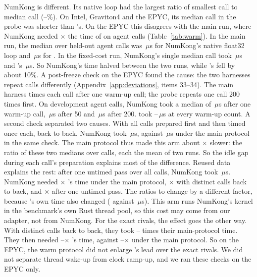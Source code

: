 NumKong is different.
Its native loop had the largest ratio of smallest call to median call (--\%).
On Intel, Graviton4 and the EPYC, its median call in the probe was shorter than \sweet's.
On the EPYC this disagrees with the main run, where NumKong needed $\times$ the time of \sweet on agent calls (Table~\ref{tab:warm}).
In the main run, the median over held-out agent calls was \,$\mu$s for NumKong's native float32 loop and \,$\mu$s for \sweet.
In the fixed-cost run, NumKong's single median call took \,$\mu$s and \sweet's \,$\mu$s.
So NumKong's time halved between the two runs, while \sweet's fell by about 10\%.
A post-freeze check on the EPYC found the cause: the two harnesses repeat calls differently (Appendix~\ref{app:deviations}, items 33--34).
The main harness times each call after one warm-up call; the probe repeats one call 200 times first.
On  development agent calls, NumKong took a median of \,$\mu$s after one warm-up call, \,$\mu$s after 50 and \,$\mu$s after 200.
\sweet took --\,$\mu$s at every warm-up count.
A second check separated two causes.
With all calls prepared first and then timed once each, back to back, NumKong took \,$\mu$s, against \,$\mu$s under the main protocol in the same check.
The main protocol thus made this arm about $\times$ slower: the ratio of these two medians over calls, each the mean of two runs.
So the idle gap during each call's preparation explains most of the difference.
Reused data explains the rest: after one untimed pass over all calls, NumKong took \,$\mu$s.
NumKong needed $\times$ \sweet's time under the main protocol, $\times$ with distinct calls back to back, and $\times$ after one untimed pass.
The ratios to \sweet change by a different factor, because \sweet's own time also changed ( against \,$\mu$s).
This arm runs NumKong's kernel in the benchmark's own Rust thread pool, so this cost may come from our adapter, not from NumKong.
For the exact rivals, the effect goes the other way.
With distinct calls back to back, they took -- times their main-protocol time.
They then needed --$\times$ \sweet's time, against --$\times$ under the main protocol.
So on the EPYC, the warm protocol did not enlarge \sweet's lead over the exact rivals.
We did not separate thread wake-up from clock ramp-up, and we ran these checks on the EPYC only.

